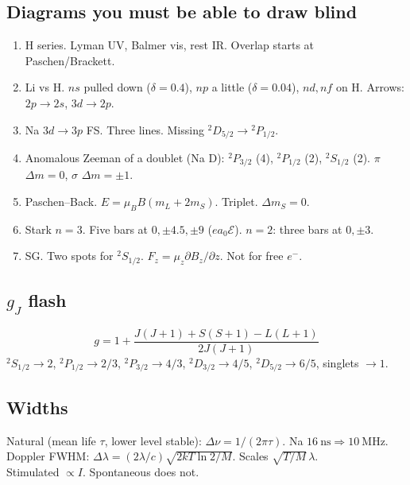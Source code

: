 \documentclass[11pt,a4paper]{article}
\begin{document}
\subsection*{Diagrams you must be able to draw blind}
\begin{enumerate}
\item H series. Lyman UV, Balmer vis, rest IR. Overlap starts at Paschen/Brackett.
\item Li vs H. \(ns\) pulled down (\(\delta=0.4\)), \(np\) a little (\(\delta=0.04\)), \(nd,nf\) on H. Arrows: \(2p\to 2s\), \(3d\to 2p\).
\item Na \(3d\to 3p\) FS. Three lines. Missing \({}^2D_{5/2}\to{}^2P_{1/2}\).
\item Anomalous Zeeman of a doublet (Na D): \({}^2P_{3/2}\) (4), \({}^2P_{1/2}\) (2), \({}^2S_{1/2}\) (2). \(\pi\) \(\Delta m=0\), \(\sigma\) \(\Delta m=\pm 1\).
\item Paschen--Back. \(E=\mu_B B(m_L+2m_S)\). Triplet. \(\Delta m_S=0\).
\item Stark \(n=3\). Five bars at \(0,\pm 4.5,\pm 9\) (\(e a_0\mathcal{E}\)). \(n=2\): three bars at \(0,\pm 3\).
\item SG. Two spots for \({}^2S_{1/2}\). \(F_z=\mu_z\partial B_z/\partial z\). Not for free \(e^-\).
\end{enumerate}

\subsection*{\(g_J\) flash}
\[
g=1+\frac{J(J+1)+S(S+1)-L(L+1)}{2J(J+1)}
\]
\({}^2S_{1/2}\to 2\), \({}^2P_{1/2}\to 2/3\), \({}^2P_{3/2}\to 4/3\), \({}^2D_{3/2}\to 4/5\), \({}^2D_{5/2}\to 6/5\), singlets \(\to 1\).

\subsection*{Widths}
Natural (mean life \(\tau\), lower level stable): \(\Delta\nu=1/(2\pi\tau)\). Na \(16~\mathrm{ns}\Rightarrow 10~\mathrm{MHz}\).\\
Doppler FWHM: \(\Delta\lambda=(2\lambda/c)\sqrt{2kT\ln 2/M}\). Scales \(\sqrt{T/M}\,\lambda\).\\
Stimulated \(\propto I\). Spontaneous does not.
\end{document}
